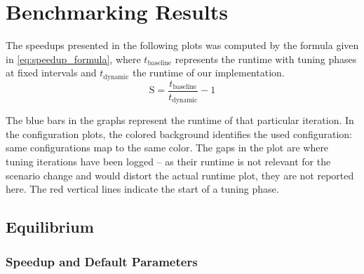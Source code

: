 




\section{Benchmarking Results}
\label{sec:benchmarking_results}

The speedups presented in the following plots was computed by the formula given in \eqref{eq:speedup_formula}, where $t_\text{baseline}$ represents the runtime with tuning phases at fixed intervals and $t_\text{dynamic}$ the runtime of our implementation.
\begin{equation}
	\text{S}=\frac{t_\text{baseline}}{t_\text{dynamic}}-1\label{eq:speedup_formula}
\end{equation}

The blue bars in the graphs represent the runtime of that particular iteration.
In the configuration plots, the colored background identifies the used configuration: same configurations map to the same color. The gaps in the plot are where tuning iterations have been logged -- as their runtime is not relevant for the scenario change and would distort the actual runtime plot, they are not reported here. The red vertical lines indicate the start of a tuning phase.

\subsection{Equilibrium}
\subsubsection{Speedup and Default Parameters}

